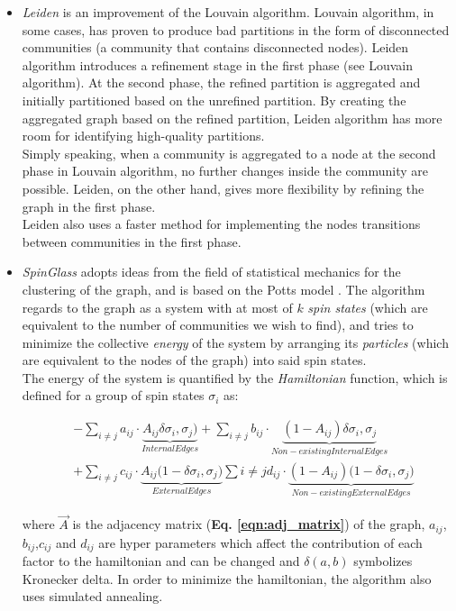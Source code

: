 \begin{itemize}
\item \textit{Leiden}\cite{Traag_2019} is an improvement of the Louvain algorithm. Louvain algorithm, in some cases, has proven to produce bad partitions in the form of disconnected communities (a community that contains disconnected nodes). Leiden algorithm introduces a refinement stage in the first phase (see Louvain algorithm). At the second phase, the refined partition is aggregated and initially partitioned based on the unrefined partition. By creating the aggregated graph based on the refined partition, Leiden algorithm has more room for identifying high-quality partitions.\\
Simply speaking, when a community is aggregated to a node at the second phase in Louvain algorithm, no further changes inside the community are possible. Leiden, on the other hand, gives more flexibility by refining the graph in the first phase.\\
Leiden also uses a faster method for implementing the nodes transitions between communities in the first phase.

\item \textit{SpinGlass}\cite{Reichardt_2006} adopts ideas from the field of statistical mechanics for the clustering of the graph, and is based on the Potts model \cite{RevModPhys.54.235}. The algorithm regards to the graph as a system with at most of $k$ \textit{spin states} (which are equivalent to the number of communities we wish to find), and tries to minimize the collective \textit{energy} of the system by arranging its \textit{particles} (which are equivalent to the nodes of the graph) into said spin states. \\ The energy of the system is quantified by the \textit{Hamiltonian} function, which is defined for a group of spin states ${\sigma_{i}}$ as:

\begin{align*}
\label{eqn:hamiltonian}
&-\sum_{i\neq j} a_{ij}\cdot \underbrace{A_{ij} \delta{\sigma_i,\sigma_j)}}_{Internal Edges}
+\sum_{i\neq j} b_{ij}\cdot \underbrace{(1-A_{ij}) \delta{\sigma_i,\sigma_j}}_{Non-existing Internal Edges}\\&
+\sum_{i\neq j} c_{ij}\cdot \underbrace{A_{ij} (1-\delta{\sigma_i,\sigma_j)}}_{External Edges} 
\sum{i\neq j} d_{ij}\cdot \underbrace{(1-A_{ij}) (1-\delta{\sigma_i,\sigma_j)}}_{Non-existing External Edges}
\end{align*}

where $\vec{A}$ is the adjacency matrix (\textbf{Eq. \ref{eqn:adj_matrix}}) of the graph, $a_{ij}$,$b_{ij}$,$c_{ij}$ and $d_{ij}$ are hyper parameters which affect the contribution of each factor to the hamiltonian and can be changed and $\delta(a,b)$ symbolizes Kronecker delta.
In order to minimize the hamiltonian, the algorithm also uses simulated annealing\cite{10.5555/800044.801546}.

\end{itemize}

